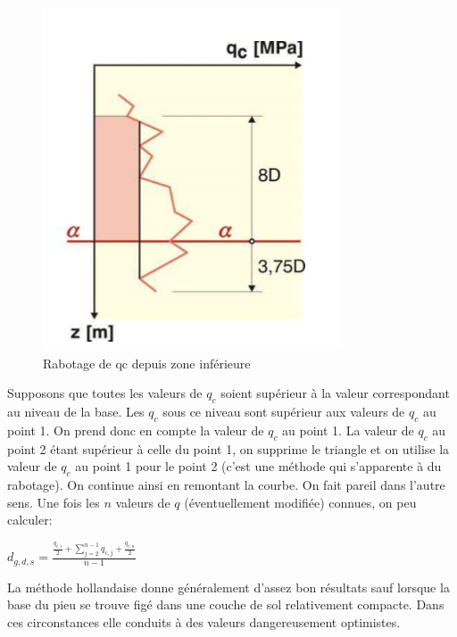\begin{multicols}{3}
            \vfill\null\columnbreak
            
                \begin{figure}[h!]
                \includegraphics[scale=0.6]{Holeyman/images/H42.PNG}
                \caption{Rabotage de qc depuis zone inférieure}
                \end{figure}
                
            \end{multicols}
        
        Supposons que toutes les valeurs de $q_c$ soient supérieur à la valeur correspondant au niveau de la base. Les $q_c$ sous ce niveau sont supérieur aux valeurs de $q_c$ au point 1. On prend donc en compte la valeur de $q_c$ au point 1. La valeur de $q_c$ au point 2 étant supérieur à celle du point 1, on supprime le triangle et on utilise la valeur de $q_c$ au point 1 pour le point 2 (c'est une méthode qui s'apparente à du rabotage). On continue ainsi en remontant la courbe. On fait pareil dans l'autre sens. Une fois les $n$ valeurs de $q$ (éventuellement modifiée) connues, on peu calculer:
        
        \begin{center}
            $ d_{g,d,s} = \frac{\frac{q_{c,i}}{2}+\sum_{j=2}^{n-1}q_{c,j}+\frac{q_{c,n}}{2}}{n-1}$
        \end{center} 
        
        La méthode hollandaise donne généralement d'assez bon résultats sauf lorsque la base du pieu se trouve figé dans une couche de sol relativement compacte. Dans ces circonstances elle conduits à des valeurs dangereusement optimistes.
        
